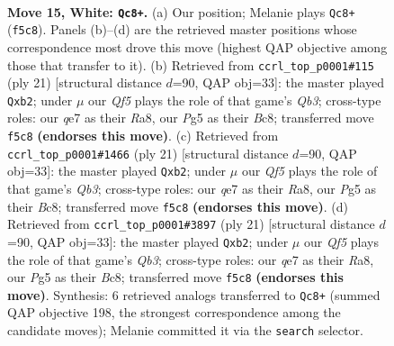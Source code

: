\documentclass[11pt]{article}
\begin{document}
\clearpage

\begin{figure}[p]\centering
\begin{subfigure}{0.46\textwidth}\centering
\resizebox{\linewidth}{!}{%
\newchessgame
\chessboard[
  setfen={rn2kbnr/4q1p1/2p5/pp1p1QP1/3P3p/5B1P/PPP2P2/R1BN1RK1 w kq - 0 15},
  showmover=false,
  pgfstyle=straightmove, color=movearrow, markmove={f5-c8}
]}
\caption{}
\end{subfigure}\hfill
\begin{subfigure}{0.46\textwidth}\centering
\resizebox{\linewidth}{!}{%
\newchessgame
\chessboard[
  setfen={rnb1k2r/1p2pp1p/1q3bp1/3P4/p2N4/2N1P3/PP3PPP/R2QKB1R b KQkq - 1 11},
  showmover=false,
  pgfstyle=straightmove, color=movearrow, markmove={b6-b2}
]}
\caption{}
\end{subfigure}
\\[4pt]
\begin{subfigure}{0.46\textwidth}\centering
\resizebox{\linewidth}{!}{%
\newchessgame
\chessboard[
  setfen={rnb1k2r/1p2pp1p/1q3bp1/3P4/p2N4/2N1P3/PP3PPP/R2QKB1R b KQkq - 1 11},
  showmover=false,
  pgfstyle=straightmove, color=movearrow, markmove={b6-b2}
]}
\caption{}
\end{subfigure}\hfill
\begin{subfigure}{0.46\textwidth}\centering
\resizebox{\linewidth}{!}{%
\newchessgame
\chessboard[
  setfen={rnb1k2r/1p2pp1p/1q3bp1/3P4/p2N4/2N1P3/PP3PPP/R2QKB1R b KQkq - 1 11},
  showmover=false,
  pgfstyle=straightmove, color=movearrow, markmove={b6-b2}
]}
\caption{}
\end{subfigure}
\caption{\textbf{Move 15, White: \texttt{Qc8+}.} (a) Our position; Melanie plays \texttt{Qc8+} (\texttt{f5c8}). Panels (b)--(d) are the retrieved master positions whose correspondence most drove this move (highest QAP objective among those that transfer to it). (b) Retrieved from \texttt{ccrl\_top\_p0001\#115} (ply 21) [structural distance $d$=90, QAP obj=33]: the master played \texttt{Qxb2}; under $\mu$ our \emph{Qf5} plays the role of that game's \emph{Qb3}; cross-type roles: our \emph{q}e7 as their \emph{R}a8, our \emph{P}g5 as their \emph{B}c8; transferred move \texttt{f5c8} \textbf{(endorses this move)}. (c) Retrieved from \texttt{ccrl\_top\_p0001\#1466} (ply 21) [structural distance $d$=90, QAP obj=33]: the master played \texttt{Qxb2}; under $\mu$ our \emph{Qf5} plays the role of that game's \emph{Qb3}; cross-type roles: our \emph{q}e7 as their \emph{R}a8, our \emph{P}g5 as their \emph{B}c8; transferred move \texttt{f5c8} \textbf{(endorses this move)}. (d) Retrieved from \texttt{ccrl\_top\_p0001\#3897} (ply 21) [structural distance $d$=90, QAP obj=33]: the master played \texttt{Qxb2}; under $\mu$ our \emph{Qf5} plays the role of that game's \emph{Qb3}; cross-type roles: our \emph{q}e7 as their \emph{R}a8, our \emph{P}g5 as their \emph{B}c8; transferred move \texttt{f5c8} \textbf{(endorses this move)}. Synthesis: 6 retrieved analogs transferred to \texttt{Qc8+} (summed QAP objective 198, the strongest correspondence among the candidate moves); Melanie committed it via the \texttt{search} selector.}
\label{fig:thought-m28}
\end{figure}
\end{document}
